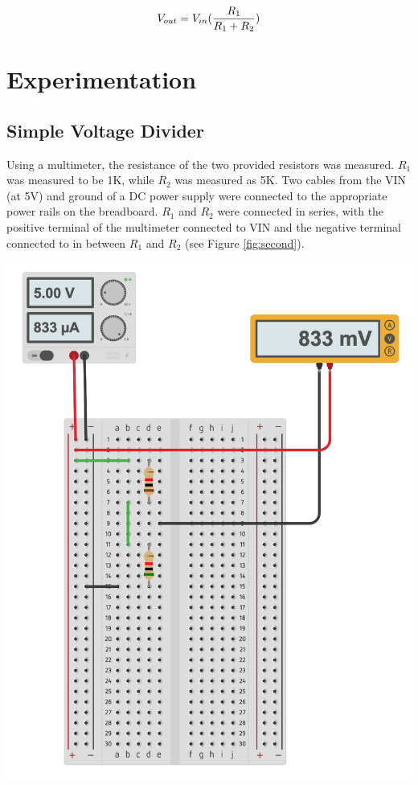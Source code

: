 \documentclass[journal]{IEEEtran}
\begin{document}
\begin{equation}
V_{out} = V_{in} (\frac{R\textsubscript{1}}{R\textsubscript{1} + R\textsubscript{2}})
\label{eq:voltage}
\end{equation}


\smallskip
\section{Experimentation}
\subsection{Simple Voltage Divider}

\noindent Using a multimeter, the resistance of the two provided resistors was measured. $R_1$ was measured to be 1K\ohm, while $R_2$ was measured as 5K\ohm. Two cables from the VIN (at 5V) and ground of a DC power supply were connected to the appropriate power rails on the breadboard. $R_1$ and $R_2$ were connected in series, with the positive terminal of the multimeter connected to VIN and the negative terminal connected to in between $R_1$ and $R_2$ (see Figure \ref{fig:second}).

\begingroup
    \medskip
    \centering
    \includegraphics[scale=0.3]{images/lab1_2.png}
    \label{fig:second}
    \medskip
\endgroup
\end{document}
